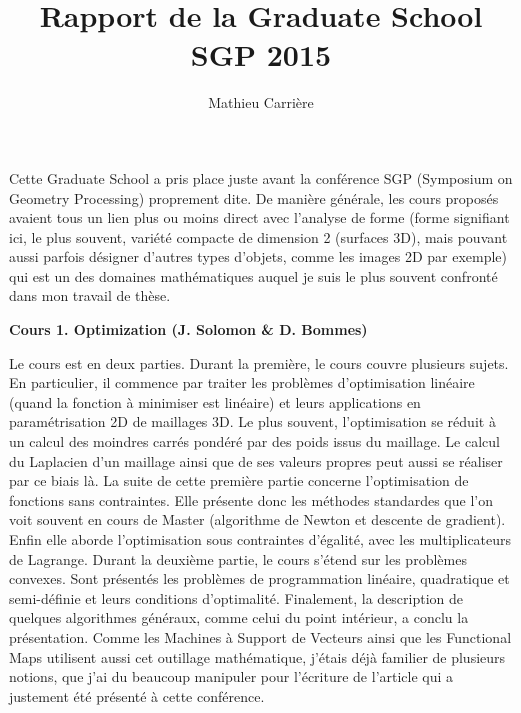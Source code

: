 \documentclass[a4paper, 11pt]{article}
\begin{document}
 
\title{Rapport de la Graduate School SGP 2015}
\author{Mathieu Carri\`ere}
\date{}
 
\maketitle

Cette Graduate School a pris place juste avant la conf\'erence SGP (Symposium on Geometry Processing) 
proprement dite. De mani\`ere g\'en\'erale, les cours propos\'es avaient tous un lien plus ou moins
direct avec l'analyse de forme (forme signifiant ici, le plus souvent, vari\'et\'e compacte de dimension 2 
(surfaces 3D), mais pouvant aussi parfois d\'esigner d'autres types d'objets, comme les images 2D par exemple) 
qui est un des domaines math\'ematiques auquel je suis le plus souvent confront\'e dans mon travail de th\`ese.  

\begin{center} \textbf{Cours 1. Optimization (J. Solomon \& D. Bommes)} \end{center}

Le cours est en deux parties. Durant la premi\`ere, le cours couvre plusieurs sujets. En particulier, il commence par traiter les probl\`emes d'optimisation
lin\'eaire (quand la fonction \`a minimiser est lin\'eaire) et leurs applications en param\'etrisation 2D de maillages 3D.
Le plus souvent, l'optimisation se r\'eduit \`a un calcul des moindres carr\'es pond\'er\'e par des poids issus du maillage. Le calcul
du Laplacien d'un maillage ainsi que de ses valeurs propres peut aussi se r\'ealiser par ce biais l\`a. La suite de cette premi\`ere
partie concerne l'optimisation de fonctions sans contraintes. Elle pr\'esente donc les m\'ethodes standardes que l'on voit souvent 
en cours de Master (algorithme de Newton et descente de gradient). Enfin elle aborde l'optimisation sous contraintes d'\'egalit\'e,
avec les multiplicateurs de Lagrange. Durant la deuxi\`eme partie, le cours s'\'etend sur les probl\`emes convexes. Sont pr\'esent\'es
les probl\`emes de programmation lin\'eaire, quadratique et semi-d\'efinie et leurs conditions d'optimalit\'e. Finalement, la description de
quelques algorithmes g\'en\'eraux, comme celui du point int\'erieur, a conclu la pr\'esentation. Comme les Machines \`a Support de Vecteurs
ainsi que les Functional Maps utilisent aussi cet outillage math\'ematique, j'\'etais d\'ej\`a familier de plusieurs notions, que j'ai
du beaucoup manipuler pour l'\'ecriture de l'article qui a justement \'et\'e pr\'esent\'e \`a cette conf\'erence. 
\end{document}
